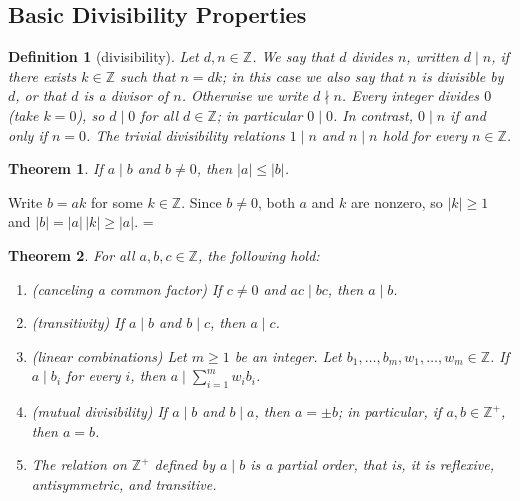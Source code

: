 \documentclass[11pt]{article}
\makeatletter
\theoremstyle{ntstyle}
\newtheorem{theorem}{Theorem}[subsection]
\newtheorem{definition}{Definition}[subsection]
\let\nt@closedisplay\]
\def\nt@guardedclose{\@ifnextchar\par{\nt@closeafterpar}{\@ifnextchar\end{\postdisplaypenalty\@M\nt@closedisplay}{\nt@closedisplay}}}
\def\nt@closeafterpar\par{\@ifnextchar\par{\nt@closeafterpar}{\@ifnextchar\end{\postdisplaypenalty\@M\nt@closedisplay\par}{\nt@closedisplay\par}}}
\renewenvironment{proof}[1][\proofname]{\par
  \pushQED{\qed}\normalfont\topsep\medskipamount\edef\nt@afterproof{\@endparpenalty=\the\@endparpenalty\relax}\@beginparpenalty\@M\@endparpenalty\@M\let\]\nt@guardedclose\trivlist\item[]\textit{#1\@addpunct{.}} \ignorespaces}{\ifvmode\addpenalty\@M\fi\popQED\nt@afterproof\endtrivlist\@endpefalse}
\makeatother
\begin{document}
\subsection{Basic Divisibility Properties}

\begin{definition}[divisibility]\label{def:1.1.1}
	Let $d,n\in\mathbb{Z}$.
	We say that $d$ divides $n$, written $d\mid n$, if there exists $k\in\mathbb{Z}$ such that $n=dk$;
	in this case we also say that $n$ is divisible by $d$, or that $d$ is a divisor of $n$.
	Otherwise we write $d\nmid n$.
	Every integer divides $0$ (take $k=0$), so $d\mid0$ for all $d\in\mathbb{Z}$; in particular $0\mid0$.
	In contrast, $0\mid n$ if and only if $n=0$.
	The trivial divisibility relations $1\mid n$ and $n\mid n$ hold for every $n\in\mathbb{Z}$.
\end{definition}
\begin{theorem}\label{thm:1.1.1}
	If $a\mid b$ and $b\neq0$, then $|a|\le|b|$.
\end{theorem}

\begin{proof} Write $b = ak$ for some $k\in\mathbb{Z}$. Since $b \neq 0$, both $a$ and $k$
	are nonzero, so $|k| \ge 1$ and $|b| = |a|\,|k| \ge |a|$.
\end{proof}
\begin{theorem}\label{thm:1.1.2}
	For all $a,b,c\in\mathbb{Z}$, the following hold:

	\begin{enumerate}[label={\alph*)}]
		\item (canceling a common factor) If $c\neq0$ and $ac\mid bc$, then $a\mid b$.
		\item (transitivity) If $a\mid b$ and $b\mid c$, then $a\mid c$.
		\item (linear combinations) Let $m\ge1$ be an integer.
					Let $b_1,\ldots,b_m,w_1,\ldots,w_m\in\mathbb{Z}$. If $a\mid b_i$ for every $i$, then $a\mid\sum_{i=1}^{m}w_i b_i$.
		\item (mutual divisibility) If $a\mid b$ and $b\mid a$, then $a=\pm b$; in particular, if
		$a,b\in\mathbb{Z}^+$, then $a=b$.
		\item The relation on $\mathbb{Z}^+$ defined by $a\mid b$ is a partial order, that is, it is
		reflexive, antisymmetric, and transitive.
	\end{enumerate}
\end{theorem}
\end{document}
